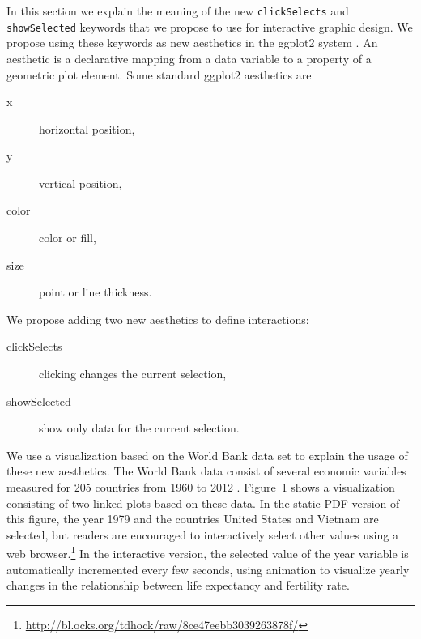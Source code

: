 \documentclass[journal]{vgtc}\usepackage[]{graphicx}\usepackage[]{color}
\begin{document}


In this section we explain the meaning of the new
\texttt{clickSelects} and \texttt{showSelected} keywords that we
propose to use for interactive graphic design. We
propose using these keywords as new aesthetics in the ggplot2 system
\citep{ggplot2-book}. An aesthetic is a declarative mapping from a
data variable to a property of a geometric plot element. Some standard
ggplot2 aesthetics are
\begin{description}
\item[x] horizontal position,
\item[y] vertical position,
\item[color] color or fill,
\item[size] point or line thickness.
\end{description}
We propose adding two new aesthetics to define interactions:
\begin{description}
\item[clickSelects] clicking changes the current selection,
\item[showSelected] show only data for the current selection.
\end{description}

We use a visualization based on the World Bank data set to explain
the usage of these new aesthetics. The World Bank data consist of
several economic variables measured for 205 countries from 1960 to
2012 \citep{WorldBank}. Figure~1 shows a visualization consisting of
two linked plots based on these data. In the static PDF version of
this figure, the year 1979 and the countries United States and Vietnam
are selected, but readers are encouraged to interactively select other
values using a web
browser.\footnote{\url{http://bl.ocks.org/tdhock/raw/8ce47eebb3039263878f/}}
In the interactive version, the selected value of the year variable is
automatically incremented every few seconds, using animation to
visualize yearly changes in the relationship between life expectancy
and fertility rate.
\end{document}
